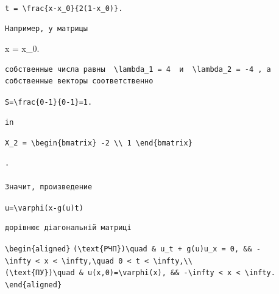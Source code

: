 \documentclass[
  ukrainian,
]{article}
\begin{document}
\texttt{t\ =\ \textbackslash{}frac\{x-x\_0\}\{2(1-x\_0)\}.}

\begin{verbatim}
Например, у матрицы
\end{verbatim}

x = x\_0.

\begin{verbatim}
собственные числа равны  \lambda_1 = 4  и  \lambda_2 = -4 , а собственные векторы соответственно
\end{verbatim}

\texttt{S=\textbackslash{}frac\{0-1\}\{0-1\}=1.}

\begin{verbatim}
in
\end{verbatim}

\texttt{X\_2\ =\ \textbackslash{}begin\{bmatrix\}\ -2\ \textbackslash{}\textbackslash{}\ 1\ \textbackslash{}end\{bmatrix\}}

\begin{verbatim}
.

Значит, произведение
\end{verbatim}

\texttt{u=\textbackslash{}varphi(x-g(u)t)}

\begin{verbatim}
дорівнює діагональній матриці
\end{verbatim}

\texttt{\textbackslash{}begin\{aligned\}}
\texttt{(\textbackslash{}text\{РЧП\})\textbackslash{}quad\ \&\ u\_t\ +\ g(u)u\_x\ =\ 0,\ \&\&\ -\textbackslash{}infty\ \textless{}\ x\ \textless{}\ \textbackslash{}infty,\textbackslash{}quad\ 0\ \textless{}\ t\ \textless{}\ \textbackslash{}infty,\textbackslash{}\textbackslash{}}
\texttt{(\textbackslash{}text\{ПУ\})\textbackslash{}quad\ \&\ u(x,0)=\textbackslash{}varphi(x),\ \&\&\ -\textbackslash{}infty\ \textless{}\ x\ \textless{}\ \textbackslash{}infty.}
\texttt{\textbackslash{}end\{aligned\}}
\end{document}
